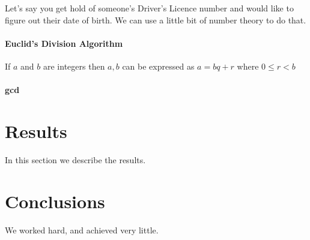 \documentclass[12pt]{article}
\begin{document}
\maketitle


Let's say you get hold of someone's Driver's Licence number and would like to figure out their date of birth. We can use a little bit of number theory to do that.

\paragraph{Euclid's Division Algorithm}
If $a$ and $b$ are integers then $a,b$ can be expressed as $a = bq + r$  where $ 0 \leq  r < b$

\paragraph{gcd}
\section{Results}\label{results}
In this section we describe the results.

\section{Conclusions}\label{conclusions}
We worked hard, and achieved very little.



\end{document}
